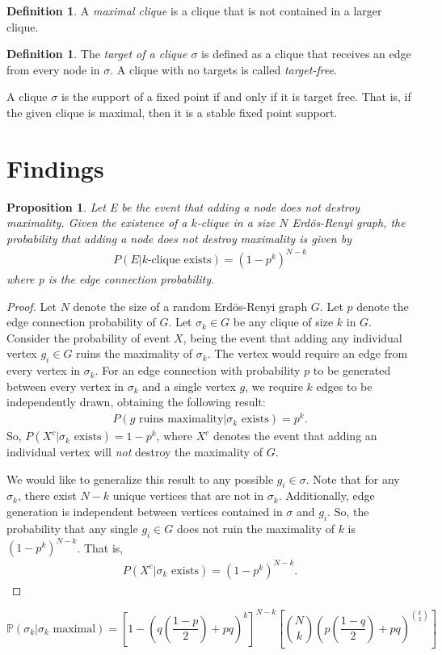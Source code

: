 \documentclass{article}
\newtheorem{prop}[thm]{Proposition}
\theoremstyle{definition}
\newtheorem{defn}[thm]{Definition}
\theoremstyle{remark}
\begin{document}
\begin{defn}
    A \textit{maximal clique} is a clique that is not contained in a larger clique.
\end{defn}

\begin{defn}
    The \textit{target of a clique $\sigma$} is defined as a clique that receives an edge from every node in $\sigma$. A clique with no targets is called \textit{target-free}.
\end{defn}

A clique $\sigma$ is the support of a fixed point if and only if it is target free. That is, if the given clique is maximal, then it is a stable fixed point support.

\section{Findings}
\label{sec:Findings}
\begin{prop}
    Let E be the event that adding a node does not destroy maximality. Given the existence of a $k$-clique in a size $N$ Erd{\"o}s-Renyi graph, the probability that adding a node does not destroy maximality is given by
    \begin{align}
        \label{eq:e of max clique}
        P(E|k\text{-clique exists}) = (1-p^k)^{N-k}
    \end{align}
    where p is the edge connection probability.
\end{prop}
\begin{proof}
    Let $N$ denote the size of a random Erd{\"o}s-Renyi graph $G$. Let $p$ denote the edge connection probability of $G$. Let $\sigma_k\in G$ be any clique of size $k$ in $G$. Consider the probability of event $X$, being the event that adding any individual vertex $g_i\in G$ ruins the maximality of $\sigma_k$. The vertex would require an edge from every vertex in $\sigma_k$. For an edge connection with probability $p$ to be generated between every vertex in $\sigma_k$ and a single vertex $g$, we require $k$ edges to be independently drawn, obtaining the following result:
    \begin{align}
        \label{eq:}
        P \left(g \text{ ruins maximality}|\sigma_k \text{ exists} \right) = p^k.
    \end{align}
    So, $P(X^c|\sigma_k \text{ exists}) = 1-p^k$, where $X^c$ denotes the event that adding an individual vertex will \textit{not} destroy the maximality of $G$.

    We would like to generalize this result to any possible $g_i\in\sigma$. Note that for any $\sigma_k$, there exist $N-k$ unique vertices that are not in $\sigma_k$. Additionally, edge generation is independent between vertices contained in $\sigma$ and $g_i$. So, the probability that any single $g_i\in G$ does not ruin the maximality of $k$ is $(1-p^k)^{N-k}$. That is,
    \begin{align}
        \label{eq:}
        P \left( X^c|\sigma_k \text{ exists} \right) = (1-p^k)^{N-k}.
    \end{align}
\end{proof}



\[
    \mathbb{P}(\sigma_k|\sigma_k\mbox{ maximal}) = \left[1-\left(q\left(\frac{1-p}{2}\right) +pq\right)^k\right]^{N-k} \left[\binom{N}{k}\left(p\left(\frac{1-q}{2}\right)+pq\right)^{\binom{k}{2}}\right]
\]
\end{document}
